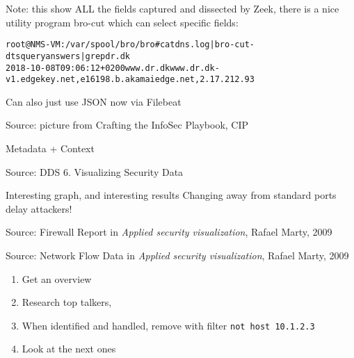 \documentclass[Screen16to9,17pt]{foils}
\begin{document}
Note: this show ALL the fields captured and dissected by Zeek, there is a nice utility program bro-cut which can select specific fields:

\begin{alltt}\small
root@NMS-VM:/var/spool/bro/bro# cat dns.log | bro-cut -d ts query answers | grep dr.dk
2018-10-08T09:06:12+0200	www.dr.dk	www.dr.dk-v1.edgekey.net,e16198.b.akamaiedge.net,2.17.212.93
\end{alltt}

Can also just use JSON now via Filebeat




Source: picture from Crafting the InfoSec Playbook, CIP

Metadata + Context



Source: DDS 6. Visualizing Security Data

\begin{list2}
\item Interesting graph, and interesting results Changing away from standard ports delay attackers!
\end{list2}





Source: Firewall Report in \emph{Applied security visualization}, Rafael Marty, 2009




Source: Network Flow Data in \emph{Applied security visualization}, Rafael Marty, 2009





\begin{quote}

\end{quote}

\begin{enumerate}
\item Get an overview
\item Research top talkers,
\item When identified and handled, remove with filter \verb+not host 10.1.2.3+
\item Look at the next ones
\end{enumerate}
\end{document}
